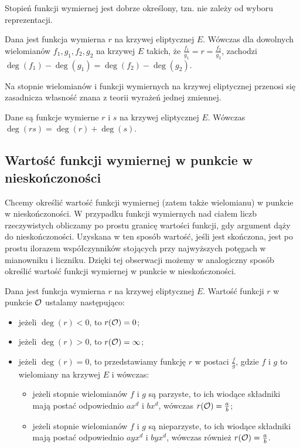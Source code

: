\noindent
Stopień funkcji wymiernej jest dobrze określony,
tzn. nie zależy od wyboru reprezentacji.

\begin{theorem}
Dana jest funkcja wymierna $r$ na krzywej eliptycznej $E$.
Wówczas dla dowolnych wielomianów $f_1, g_1, f_2, g_2$ na krzywej $E$ takich,
że $\frac{f_1}{g_1} = r = \frac{f_2}{g_2}$,
zachodzi $\deg(f_1) - \deg(g_1) = \deg(f_2) - \deg(g_2)$.
\end{theorem}

\noindent
Na stopnie wielomianów i funkcji wymiernych na krzywej eliptycznej
przenosi się zasadnicza własność znana z teorii wyrażeń jednej zmiennej.

\begin{theorem}
Dane są funkcje wymierne $r$ i $s$ na krzywej eliptycznej $E$.
Wówczas $\deg(rs) = \deg(r) + \deg(s)$.
\end{theorem}

\subsection*{Wartość funkcji wymiernej w punkcie w nieskończoności}

\noindent
Chcemy określić wartość funkcji wymiernej (zatem także wielomianu)
w punkcie w nieskończoności.
W przypadku funkcji wymiernych nad ciałem liczb rzeczywistych
obliczamy po prostu granicę wartości funkcji,
gdy argument dąży do nieskończoności.
Uzyskana w ten sposób wartość, jeśli jest skończona,
jest po prostu ilorazem współczynników stojących przy najwyższych potęgach
w mianowniku i liczniku.
Dzięki tej obserwacji możemy w analogiczny sposób określić
wartość funkcji wymiernej w punkcie w nieskończoności.

\begin{definition}
Dana jest funkcja wymierna $r$ na krzywej eliptycznej $E$.
Wartość funkcji $r$ w punkcie $\mathcal{O}$ ustalamy następująco:
\begin{itemize}
\item jeżeli $\deg(r) < 0$, to $r(\mathcal{O}) = 0$;
\item jeżeli $\deg(r) > 0$, to $r(\mathcal{O}) = \infty$;
\item jeżeli $\deg(r) = 0$,
to przedstawiamy funkcję $r$ w postaci $\frac{f}{g}$,
gdzie $f$ i $g$ to wielomiany na krzywej $E$ i wówczas:
\begin{itemize}
\item jeżeli stopnie wielomianów $f$ i $g$ są parzyste,
to ich wiodące składniki mają postać odpowiednio $ax^d$ i $bx^d$,
wówczas $r(\mathcal{O}) = \frac{a}{b}$;
\item jeżeli stopnie wielomianów $f$ i $g$ są nieparzyste,
to ich wiodące składniki mają postać odpowiednio $ayx^d$ i $byx^d$,
wówczas również $r(\mathcal{O}) = \frac{a}{b}$.
\end{itemize}
\end{itemize}
\end{definition}

